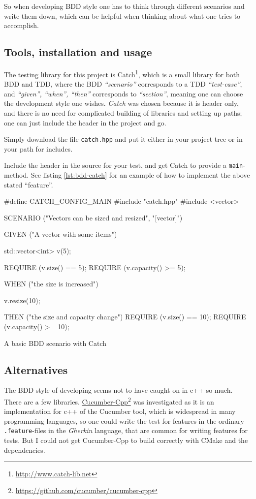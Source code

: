 \documentclass[../main.tex]{subfiles}
\begin{document}
So when developing BDD style one has to think through different scenarios and write them down, which can be helpful when thinking about what one tries to accomplish.

\subsection{Tools, installation and usage}\label{catch-tool}
The testing library for this project is \href{http://www.catch-lib.net}{Catch}\footnote{\url{http://www.catch-lib.net}}, which is a small library for both BDD and TDD, where the BDD \emph{``scenario''} corresponds to a TDD \emph{``test-case''}, and \emph{``given'', ``when'', ``then''} corresponds to \emph{``section''}, meaning one can choose the development style one wishes. \emph{Catch} was chosen because it is header only, and there is no need for complicated building of libraries and setting up paths; one can just include the header in the project and go.

Simply download the file \texttt{catch.hpp} and put it either in your project tree or in your path for includes.

Include the header in the source for your test, and get Catch to provide a \texttt{main}-method. See listing \ref{lst:bdd-catch} for an example of how to implement the above stated ``feature''.

\begin{mylisting}
\begin{cppcode}
#define CATCH_CONFIG_MAIN
#include "catch.hpp"
#include <vector>

SCENARIO ("Vectors can be sized and resized", "[vector]") {
	GIVEN ("A vector with some items") {
		std::vector<int> v(5);

		REQUIRE (v.size() == 5);
		REQUIRE (v.capacity() >= 5);

		WHEN ("the size is increased") {
			v.resize(10);

			THEN ("the size and capacity change") {
				REQUIRE (v.size() == 10);
				REQUIRE (v.capacity() >= 10);
			}
		}
	}
}
\end{cppcode}
\caption{A basic BDD scenario with Catch}
\label{lst:bdd-catch}
\end{mylisting}

\subsection{Alternatives}
The BDD style of developing seems not to have caught on in c++ so much. There are a few libraries. \href{https://github.com/cucumber/cucumber-cpp}{Cucumber-Cpp}\footnote{\url{https://github.com/cucumber/cucumber-cpp}} was investigated as it is an implementation for c++ of the Cucumber tool, which is widespread in many programming languages, so one could write the test for features in the ordinary \texttt{.feature}-files in the \emph{Gherkin} language, that are common for writing features for tests. But I could not get Cucumber-Cpp to build correctly with CMake and the dependencies.
\end{document}
